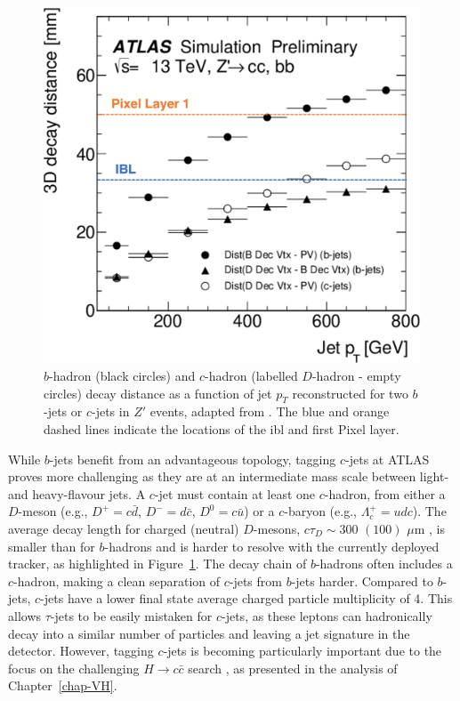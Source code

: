 \begin{figure}[h!]
\begin{minipage}{0.48\textwidth}
  \includegraphics[width=\textwidth]{Images/FTAG/intro/bhaddecay2ada.png}
  \caption{$b$-hadron (black circles) and $c$-hadron (labelled $D$-hadron - empty circles) decay distance as a function of jet $p_T$ reconstructed for two $b$-jets or $c$-jets in $Z'$ events, adapted from \cite{ATL-PHYS-PUB-2018-025}. The blue and orange dashed lines indicate the locations of the \gls{ibl} and first Pixel layer.} 
  \label{fig:bhaddecay}
\end{minipage}
\end{figure}

While $b$-jets benefit from an advantageous topology, tagging $c$-jets at ATLAS proves more challenging as they are at an intermediate mass scale between light- and heavy-flavour jets. A $c$-jet must contain at least one $c$-hadron, from either a $D$-meson (e.g., $D^+=c\bar{d}$, $D^-=d\bar{c}$, $D^0=c\bar{u}$) or a $c$-baryon (e.g., $\Lambda_c^+=udc$). The average decay length for charged (neutral) $D$-mesons, $c\tau_D \sim 300$ $(100)$ $\mu$m \cite{Tanabashi:2018oca}, is smaller than for $b$-hadrons and is harder to resolve with the currently deployed tracker, as highlighted in Figure~\ref{fig:bhaddecay}. The decay chain of $b$-hadrons often includes a $c$-hadron, making a clean separation of $c$-jets from $b$-jets harder. Compared to $b$-jets, $c$-jets have a lower final state average charged particle multiplicity of 4. This allows $\tau$-jets to be easily mistaken for $c$-jets, as these leptons can hadronically decay into a similar number of particles and leaving a jet signature in the detector. However, tagging $c$-jets is becoming particularly important due to the focus on the challenging $H \rightarrow c\bar{c}$ search \cite{Aaboud:2018fhh, Collaboration:2721696, arXiv:2205.05550}, as presented in the analysis of Chapter~\ref{chap-VH}. 

